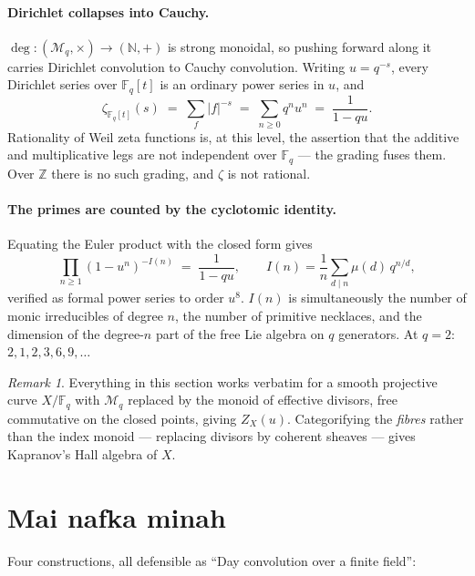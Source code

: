 \documentclass[11pt,a4paper]{article}
\theoremstyle{definition}
\theoremstyle{remark}
\newtheorem{remark}[theorem]{Remark}
\newcommand{\FF}{\mathbb{F}}
\newcommand{\NN}{\mathbb{N}}
\newcommand{\ZZ}{\mathbb{Z}}
\newcommand{\norm}[1]{\lvert #1 \rvert}
\begin{document}
\paragraph{Dirichlet collapses into Cauchy.}
$\deg : (\mathcal{M}_q,\times) \to (\NN,+)$ is strong monoidal, so pushing forward along it
carries Dirichlet convolution to Cauchy convolution. Writing $u = q^{-s}$, every Dirichlet
series over $\FF_q[t]$ is an ordinary power series in $u$, and
\[
  \zeta_{\FF_q[t]}(s) \;=\; \sum_{f} \norm{f}^{-s} \;=\; \sum_{n\ge0} q^n u^n
  \;=\; \frac{1}{1-qu}.
\]
Rationality of Weil zeta functions is, at this level, the assertion that the additive and
multiplicative legs are not independent over $\FF_q$ --- the grading fuses them. Over
$\ZZ$ there is no such grading, and $\zeta$ is not rational.

\paragraph{The primes are counted by the cyclotomic identity.}
Equating the Euler product with the closed form gives
\[
  \prod_{n\ge1}(1-u^n)^{-I(n)} \;=\; \frac{1}{1-qu},
  \qquad
  I(n) = \frac1n \sum_{d \mid n} \mu(d)\, q^{n/d},
\]
verified as formal power series to order $u^8$. $I(n)$ is simultaneously the number of
monic irreducibles of degree $n$, the number of primitive necklaces, and the dimension of
the degree-$n$ part of the free Lie algebra on $q$ generators. At $q=2$:
$2,1,2,3,6,9,\dots$

\begin{remark}
Everything in this section works verbatim for a smooth projective curve $X/\FF_q$ with
$\mathcal{M}_q$ replaced by the monoid of effective divisors, free commutative on the
closed points, giving $Z_X(u)$. Categorifying the \emph{fibres} rather than the index
monoid --- replacing divisors by coherent sheaves --- gives Kapranov's Hall algebra of
$X$.
\end{remark}

\section{Mai nafka minah}

Four constructions, all defensible as ``Day convolution over a finite field'':
\end{document}
